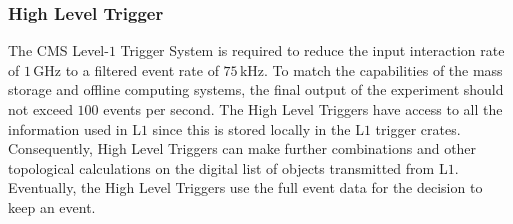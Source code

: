 \subsubsection{High Level Trigger}
The CMS Level-$1$ Trigger System is required to reduce the input interaction rate of $1 \,$GHz to a filtered event rate of $75 \,$kHz. To match the capabilities of the mass storage and offline computing systems, the final output of the experiment should not exceed $100$ events per second. The High Level Triggers have access to all the information used in L$1$ since this is stored locally in the L$1$ trigger crates. Consequently, High Level Triggers can make further combinations and other topological calculations on the digital list of objects transmitted from L$1$. Eventually, the High Level Triggers use the full event data for the decision to keep an event.



